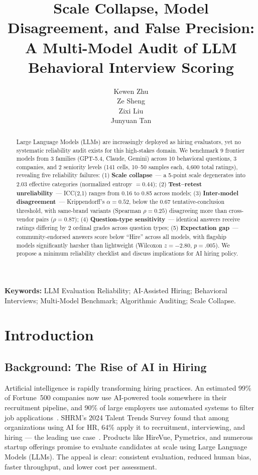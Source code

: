\documentclass{article}
\title{Scale Collapse, Model Disagreement, and False Precision:\\
A Multi-Model Audit of LLM Behavioral Interview Scoring}
\author{%
  Kewen Zhu \\
  \And
  Ze Sheng \\
  \And
  Zixi Liu \\
  \And
  Junyuan Tan \\
}
\begin{document}
\maketitle

\begin{abstract}
Large Language Models (LLMs) are increasingly deployed as hiring evaluators, yet no systematic reliability audit exists for this high-stakes domain. We benchmark 9 frontier models from 3 families (GPT-5.4, Claude, Gemini) across 10 behavioral questions, 3 companies, and 2 seniority levels (141 cells, 10--50 samples each, 4{,}600 total ratings), revealing five reliability failures: (1) \textbf{Scale collapse}~--- a 5-point scale degenerates into 2.03 effective categories (normalized entropy $=0.44$); (2) \textbf{Test--retest unreliability}~--- ICC(2,1) ranges from 0.16 to 0.85 across models; (3) \textbf{Inter-model disagreement}~--- Krippendorff's $\alpha = 0.52$, below the 0.67 tentative-conclusion threshold, with same-brand variants (Spearman $\rho=0.25$) disagreeing more than cross-vendor pairs ($\rho=0.87$); (4) \textbf{Question-type sensitivity}~--- identical answers receive ratings differing by 2 ordinal grades across question types; (5) \textbf{Expectation gap}~--- community-endorsed answers score below ``Hire'' across all models, with flagship models significantly harsher than lightweight (Wilcoxon $z=-2.80$, $p=.005$). We propose a minimum reliability checklist and discuss implications for AI hiring policy.
\end{abstract}

\textbf{Keywords:} LLM Evaluation Reliability; AI-Assisted Hiring; Behavioral Interviews; Multi-Model Benchmark; Algorithmic Auditing; Scale Collapse.

\section{Introduction}

\subsection{Background: The Rise of AI in Hiring}
Artificial intelligence is rapidly transforming hiring practices. An estimated 99\% of Fortune~500 companies now use AI-powered tools somewhere in their recruitment pipeline, and 90\% of large employers use automated systems to filter job applications~\cite{allaboutai2025}. SHRM's 2024 Talent Trends Survey found that among organizations using AI for HR, 64\% apply it to recruitment, interviewing, and hiring --- the leading use case~\cite{shrm2024}. Products like HireVue, Pymetrics, and numerous startup offerings promise to evaluate candidates at scale using Large Language Models (LLMs). The appeal is clear: consistent evaluation, reduced human bias, faster throughput, and lower cost per assessment.
\end{document}
